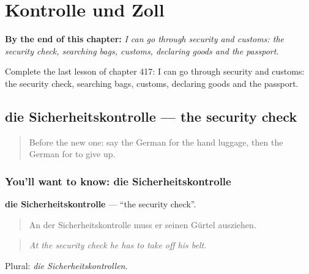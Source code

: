 
\chapter{Kontrolle und Zoll}
\label{ch:ge-kontrolle-und-zoll}

\begin{chapteropening}
\textbf{By the end of this chapter:} \emph{I can go through security and customs: the security check, searching bags, customs, declaring goods and the passport.}

Complete the last lesson of chapter 417: I can go through security and customs: the security check, searching bags, customs, declaring goods and the passport.
\end{chapteropening}

\section[die Sicherheitskontrolle]{die Sicherheitskontrolle — the security check}

\label{lesson:GE-C417-sicherheitskontrolle}



\begin{quote}
Before the new one: say the German for the hand luggage, then the German for to give up.
\end{quote}

\subsection*{You'll want to know: die Sicherheitskontrolle}
\textbf{die Sicherheitskontrolle} — \textquotedblleft{}the security check\textquotedblright{}.

\begin{quote}
An der Sicherheitskontrolle muss er seinen Gürtel ausziehen.
\end{quote}

\begin{quote}
\emph{At the security check he has to take off his belt.}
\end{quote}

Plural: \emph{die Sicherheitskontrollen}.

